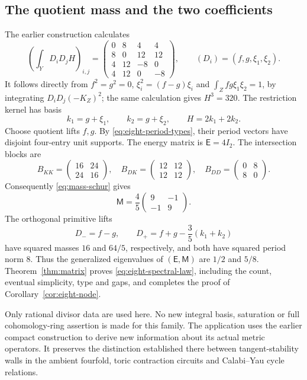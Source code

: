 \subsection{The quotient mass and the two coefficients}
The earlier construction calculates
\begin{equation}\label{eq:eight-intersection}
 \left(\int_YD_iD_jH\right)_{i,j}
 =\begin{pmatrix}
 0&8&4&4\\8&0&12&12\\4&12&-8&0\\4&12&0&-8
 \end{pmatrix},\qquad (D_i)=(f,g,\xi_1,\xi_2).
\end{equation}
It follows directly from
$f^2=g^2=0$, $\xi_i^2=(f-g)\xi_i$ and
$\int_Zfg\xi_1\xi_2=1$, by integrating $D_iD_j(-K_Z)^2$;
the same calculation gives $H^3=320$.
The restriction kernel has basis
\[
 k_1=g+\xi_1,\qquad k_2=g+\xi_2,
 \qquad H=2k_1+2k_2.
\]
Choose quotient lifts $f,g$. By \eqref{eq:eight-period-types}, their
period vectors have disjoint four-entry unit supports. The energy
matrix is $\mathsf E=4I_2$. The intersection blocks are
\[
 B_{KK}=\begin{pmatrix}16&24\\24&16\end{pmatrix},\quad
 B_{DK}=\begin{pmatrix}12&12\\12&12\end{pmatrix},\quad
 B_{DD}=\begin{pmatrix}0&8\\8&0\end{pmatrix}.
\]
Consequently \eqref{eq:mass-schur} gives
\begin{equation}\label{eq:eight-mass}
 \mathsf M=\frac45\begin{pmatrix}9&-1\\-1&9\end{pmatrix}.
\end{equation}
The orthogonal primitive lifts
\[
 D_-=f-g,\qquad D_+=f+g-\frac35(k_1+k_2)
\]
have squared masses $16$ and $64/5$, respectively, and both have
squared period norm $8$. Thus the generalized eigenvalues of
$(\mathsf E,\mathsf M)$ are $1/2$ and $5/8$.
Theorem~\ref{thm:matrix} proves \eqref{eq:eight-spectral-law},
including the count, eventual simplicity, type and gaps, and completes
the proof of Corollary~\ref{cor:eight-node}.

Only rational divisor data are used here. No new integral basis,
saturation or full cohomology-ring assertion is made for this family.
The application uses the earlier compact construction to derive new
information about its actual metric operators. It preserves the
distinction established there between tangent-stability walls in the
ambient fourfold, toric contraction circuits and Calabi--Yau cycle
relations.
